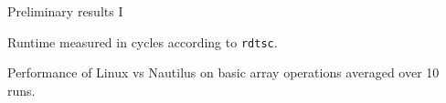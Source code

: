 \begin{block}{Preliminary results I}
\begin{table}
    Runtime measured in cycles according to \texttt{rdtsc}.

    \caption{Performance of Linux vs Nautilus on basic array operations averaged over 10 runs.}
  \end{table}
  
\end{block}

